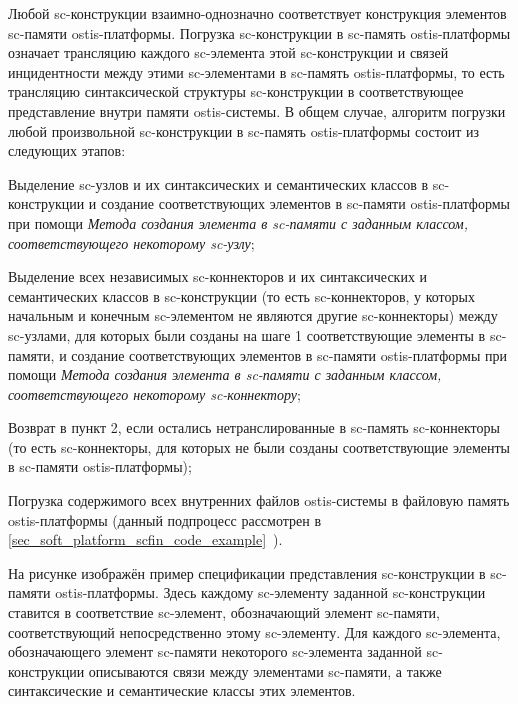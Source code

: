 Любой sc-конструкции взаимно-однозначно соответствует конструкция элементов sc-памяти ostis-платформы. Погрузка sc-конструкции в sc-память ostis-платформы означает трансляцию каждого sc-элемента этой sc-конструкции и связей инцидентности между этими sc-элементами в sc-память ostis-платформы, то есть трансляцию синтаксической структуры sc-конструкции в соответствующее представление внутри памяти ostis-системы. В общем случае, алгоритм погрузки любой произвольной sc-конструкции в sc-память ostis-платформы состоит из следующих этапов:
\begin{textitemize}
	\item Выделение sc-узлов и их синтаксических и семантических классов в sc-конструкции и создание соответствующих элементов в sc-памяти ostis-платформы при помощи \textit{Метода создания элемента в sc-памяти с заданным классом, соответствующего некоторому sc-узлу};
	\item Выделение всех независимых sc-коннекторов и их синтаксических и семантических классов в sc-конструкции (то есть sc-коннекторов, у которых начальным и конечным sc-элементом не являются другие sc-коннекторы) между sc-узлами, для которых были созданы на шаге 1 соответствующие элементы в sc-памяти, и создание соответствующих элементов в sc-памяти ostis-платформы при помощи \textit{Метода создания элемента в sc-памяти с заданным классом, соответствующего некоторому sc-коннектору};
	\item Возврат в пункт 2, если остались нетранслированные в sc-память sc-коннекторы (то есть sc-коннекторы, для которых не были созданы соответствующие элементы в sc-памяти ostis-платформы);
	\item Погрузка содержимого всех внутренних файлов ostis-системы в файловую память ostis-платформы (данный подпроцесс рассмотрен в \ref{sec_soft_platform_scfin_code_example}~).
\end{textitemize}

На рисунке  изображён пример спецификации представления sc-конструкции в sc-памяти ostis-платформы. Здесь каждому sc-элементу заданной sc-конструкции ставится в соответствие sc-элемент, обозначающий элемент sc-памяти, соответствующий непосредственно этому sc-элементу. Для каждого sc-элемента, обозначающего элемент sc-памяти некоторого sc-элемента заданной sc-конструкции описываются связи между элементами sc-памяти, а также синтаксические и семантические классы этих элементов.

